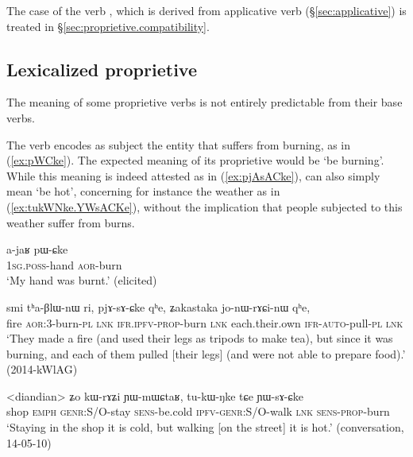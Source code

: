 The case of the verb , which is derived from applicative verb  (§\ref{sec:applicative}) is treated in §\ref{sec:proprietive.compatibility}.
  

\subsection{Lexicalized proprietive} \label{sec:proprietive.lexicalized}
The meaning of some proprietive verbs is not entirely predictable from their base verbs. 

The verb  encodes as subject the entity that suffers from burning, as in (\ref{ex:pWCke}). The expected meaning of its proprietive  would be `be burning'. While this meaning is indeed attested as in (\ref{ex:pjAsACke}),  can also simply mean `be hot', concerning for instance the weather as in (\ref{ex:tukWNke.YWsACKe}), without the implication that people subjected to this weather suffer from burns.
\largerpage
\begin{exe}
\ex \label{ex:pWCke}
\gll a-jaʁ pɯ-ɕke \\
\textsc{1sg}.\textsc{poss}-hand \textsc{aor}-burn \\
\glt `My hand was burnt.' (elicited)
\end{exe}

\begin{exe}
\ex \label{ex:pjAsACke}
\gll smi tʰa-βlɯ-nɯ ri, pjɤ-sɤ-ɕke qʰe, ʑakastaka jo-nɯ-rɤɕi-nɯ qʰe, \\
fire \textsc{aor}:3\flobv{}-burn-\textsc{pl} \textsc{lnk} \textsc{ifr}.\textsc{ipfv}-\textsc{prop}-burn \textsc{lnk} each.their.own \textsc{ifr}-\textsc{auto}-pull-\textsc{pl} \textsc{lnk} \\
\glt `They made a fire (and used their legs as tripods to make tea), but since it was burning, and each of them pulled [their legs] (and were not able to prepare food).' (2014-kWlAG)
\end{exe}

\begin{exe}
\ex \label{ex:tukWNke.YWsACKe}
\gll <diandian> ʑo kɯ-rɤʑi ɲɯ-mɯɕtaʁ, tu-kɯ-ŋke tɕe ɲɯ-sɤ-ɕke \\
shop \textsc{emph} \textsc{genr}:S/O-stay \textsc{sens}-be.cold \textsc{ipfv}-\textsc{genr}:S/O-walk \textsc{lnk} \textsc{sens}-\textsc{prop}-burn \\
\glt `Staying in the shop it is cold, but walking [on the street] it is hot.' (conversation, 14-05-10)
\end{exe}

